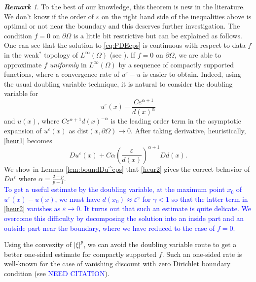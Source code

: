 \documentclass[12pt,reqno]{amsart}
\numberwithin{figure}{section}
\theoremstyle{plain}
\theoremstyle{remark}
\newtheorem{rem}{\bf{Remark}}
\numberwithin{equation}{section}
\begin{document}
\begin{rem} To the best of our knowledge, this theorem is new in the literature. We don't know if the order of $\varepsilon$ on the right hand side of the inequalities above is optimal or not near the boundary and this deserves further investigation. The condition $f = 0$ on $\partial\Omega$ is a little bit restrictive but can be explained as follows. One can see that the solution to \eqref{eq:PDEeps} is continuous with respect to data $f$ in the weak$^*$ topology of $L^\infty(\Omega)$ (see \cite{Lasry1989}). If $f = 0$ on $\partial\Omega$, we are able to approximate $f$ \emph{uniformly} in $L^\infty(\Omega)$ by a sequence of compactly supported functions, where a convergence rate of $u^\varepsilon-u$ is easier to obtain. Indeed, using the usual doubling variable technique, it is natural to consider the doubling variable for
\begin{equation}\label{heur1}
    u^\varepsilon(x) - \frac{C\varepsilon^{\alpha+1}}{d(x)^{\alpha}}
\end{equation}
and $u(x)$, where $C\varepsilon^{\alpha+1}d(x)^{-\alpha}$ is the leading order term in the asymptotic expansion of $u^\varepsilon(x)$ as $\mathrm{dist}(x,\partial\Omega)\to 0$. After taking derivative, heuristically, \eqref{heur1} becomes
\begin{equation}\label{heur2}
    Du^\varepsilon(x) + C\alpha \left(\frac{\varepsilon}{d(x)}\right)^{\alpha+1}Dd(x).
\end{equation}
We show in Lemma \ref{lem:boundDu^eps} that \eqref{heur2} gives the correct behavior of $Du^\varepsilon$ where $\alpha = \frac{2-p}{p-1}$. \\
\noindent
\textcolor{blue}{
To get a useful estimate by the doubling variable, at the maximum point $x_0$ of $u^\varepsilon(x) - u(x)$, we must have $d(x_0)\approx \varepsilon^{\gamma}$ for $\gamma<1$ so that the latter term in \eqref{heur2} vanishes as $\varepsilon\to 0$. It turns out that such an estimate is quite delicate. We overcome this difficulty by decomposing the solution into an inside part and an outside part near the boundary, where we have reduced to the case of $f=0$.}
\end{rem}

Using the convexity of $|\xi|^p$, we can avoid the doubling variable route to get a better one-sided estimate for compactly supported $f$. Such an one-sided rate is well-known for the case of vanishing discount with zero Dirichlet boundary condition (see \textcolor{blue}{NEED CITATION}).
\end{document}
